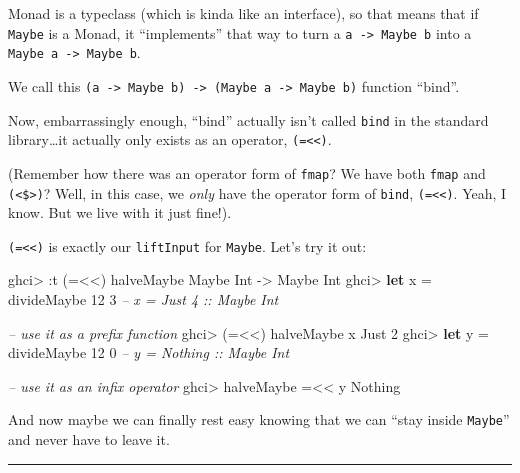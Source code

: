 \documentclass[]{article}
\newenvironment{Shaded}{}{}
\newcommand{\KeywordTok}[1]{\textcolor[rgb]{0.00,0.44,0.13}{\textbf{{#1}}}}
\newcommand{\DataTypeTok}[1]{\textcolor[rgb]{0.56,0.13,0.00}{{#1}}}
\newcommand{\DecValTok}[1]{\textcolor[rgb]{0.25,0.63,0.44}{{#1}}}
\newcommand{\CommentTok}[1]{\textcolor[rgb]{0.38,0.63,0.69}{\textit{{#1}}}}
\newcommand{\OtherTok}[1]{\textcolor[rgb]{0.00,0.44,0.13}{{#1}}}
\newcommand{\FunctionTok}[1]{\textcolor[rgb]{0.02,0.16,0.49}{{#1}}}
\newcommand{\NormalTok}[1]{{#1}}
\begin{document}
Monad is a typeclass (which is kinda like an interface), so that means that if \texttt{Maybe} is a
Monad, it ``implements'' that way to turn a \texttt{a\ -\textgreater{}\ Maybe\ b} into a
\texttt{Maybe\ a\ -\textgreater{}\ Maybe\ b}.

We call this
\texttt{(a\ -\textgreater{}\ Maybe\ b)\ -\textgreater{}\ (Maybe\ a\ -\textgreater{}\ Maybe\ b)}
function ``bind''.

Now, embarrassingly enough, ``bind'' actually isn't called \texttt{bind} in the standard
library\ldots{}it actually only exists as an operator, \texttt{(=\textless{}\textless{})}.

(Remember how there was an operator form of \texttt{fmap}? We have both \texttt{fmap} and
\texttt{(\textless{}\$\textgreater{})}? Well, in this case, we \emph{only} have the operator form of
\texttt{bind}, \texttt{(=\textless{}\textless{})}. Yeah, I know. But we live with it just fine!).

\texttt{(=\textless{}\textless{})} is exactly our \texttt{liftInput} for \texttt{Maybe}. Let's try
it out:

\begin{Shaded}
\begin{Highlighting}[]
\NormalTok{ghci}\FunctionTok{>} \FunctionTok{:}\NormalTok{t (}\FunctionTok{=<<}\NormalTok{) halveMaybe}
\DataTypeTok{Maybe} \DataTypeTok{Int} \OtherTok{->} \DataTypeTok{Maybe} \DataTypeTok{Int}
\NormalTok{ghci}\FunctionTok{>} \KeywordTok{let} \NormalTok{x }\FunctionTok{=} \NormalTok{divideMaybe }\DecValTok{12} \DecValTok{3}     \CommentTok{-- x = Just 4 :: Maybe Int}

\CommentTok{-- use it as a prefix function}
\NormalTok{ghci}\FunctionTok{>} \NormalTok{(}\FunctionTok{=<<}\NormalTok{) halveMaybe x}
\DataTypeTok{Just} \DecValTok{2}
\NormalTok{ghci}\FunctionTok{>} \KeywordTok{let} \NormalTok{y }\FunctionTok{=} \NormalTok{divideMaybe }\DecValTok{12} \DecValTok{0}     \CommentTok{-- y = Nothing :: Maybe Int}

\CommentTok{-- use it as an infix operator}
\NormalTok{ghci}\FunctionTok{>} \NormalTok{halveMaybe }\FunctionTok{=<<} \NormalTok{y}
\DataTypeTok{Nothing}
\end{Highlighting}
\end{Shaded}

And now maybe we can finally rest easy knowing that we can ``stay inside \texttt{Maybe}'' and never
have to leave it.

\begin{center}\rule{0.5\linewidth}{\linethickness}\end{center}
\end{document}
